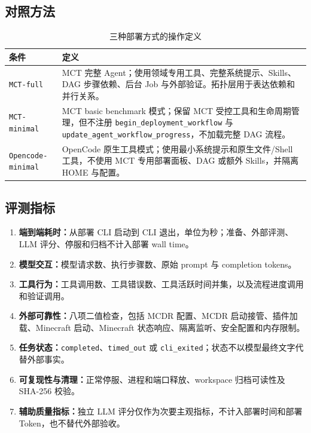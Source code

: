 \documentclass[UTF8,a4paper,11pt]{ctexart}
\newcommand{\mctfull}{\texttt{MCT-full}}
\newcommand{\mctminimal}{\texttt{MCT-minimal}}
\newcommand{\ocminimal}{\texttt{Opencode-minimal}}
\begin{document}
\subsection{对照方法}
\begin{table}[H]
\centering
\caption{三种部署方式的操作定义}
\label{tab:conditions}
\small
\begin{tabular}{p{}p{}}
\toprule
条件 & 定义 \\
\midrule
\mctfull{} & MCT 完整 Agent；使用领域专用工具、完整系统提示、Skills、DAG 步骤依赖、后台 Job 与外部验证。拓扑层用于表达依赖和并行关系。 \\
\mctminimal{} & MCT basic benchmark 模式；保留 MCT 受控工具和生命周期管理，但不注册 \texttt{begin\_deployment\_workflow} 与 \texttt{update\_agent\_workflow\_progress}，不加载完整 DAG 流程。 \\
\ocminimal{} & OpenCode 原生工具模式；使用最小系统提示和原生文件/Shell 工具，不使用 MCT 专用部署面板、DAG 或额外 Skills，并隔离 HOME 与配置。 \\
\bottomrule
\end{tabular}
\end{table}

\subsection{评测指标}
\begin{enumerate}
  \item \textbf{端到端耗时：}从部署 CLI 启动到 CLI 退出，单位为秒；准备、外部评测、LLM 评分、停服和归档不计入部署 wall time。
  \item \textbf{模型交互：}模型请求数、执行步骤数、原始 prompt 与 completion tokens。
  \item \textbf{工具行为：}工具调用数、工具错误数、工具活跃时间并集，以及流程进度调用和验证调用。
  \item \textbf{外部可靠性：}八项二值检查，包括 MCDR 配置、MCDR 启动接管、插件加载、Minecraft 启动、Minecraft 状态响应、隔离监听、安全配置和内存限制。
  \item \textbf{任务状态：}\texttt{completed}、\texttt{timed\_out} 或 \texttt{cli\_exited}；状态不以模型最终文字代替外部事实。
  \item \textbf{可复现性与清理：}正常停服、进程和端口释放、workspace 归档可读性及 SHA-256 校验。
  \item \textbf{辅助质量指标：}独立 LLM 评分仅作为次要主观指标，不计入部署时间和部署 Token，也不替代外部验收。
\end{enumerate}
\end{document}
